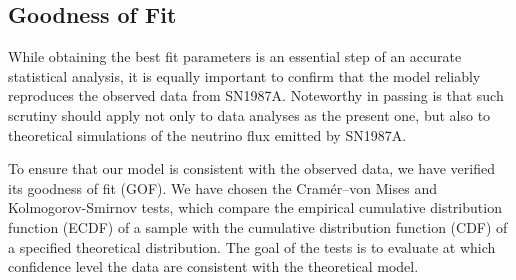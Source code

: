 \documentclass[a4paper,11pt]{article}
\begin{document}
\subsection{Goodness of Fit}
\label{sec:gof}


While obtaining the best fit parameters is an essential step of an  accurate statistical analysis,  it is equally important to confirm that the model reliably reproduces the observed data from SN1987A. Noteworthy in passing is that such scrutiny
should apply  not only to data analyses as the present one, but also to theoretical simulations of the neutrino flux emitted by SN1987A.

To ensure that our model is consistent with the observed data, we have verified its goodness of fit (GOF). 
We have chosen the Cramér–von Mises and Kolmogorov-Smirnov tests, which compare the empirical cumulative distribution function (ECDF) of a sample with the cumulative distribution function (CDF) of a specified theoretical distribution. The goal of the tests is to evaluate at which confidence level the %
data are consistent with the theoretical model. 
\end{document}
